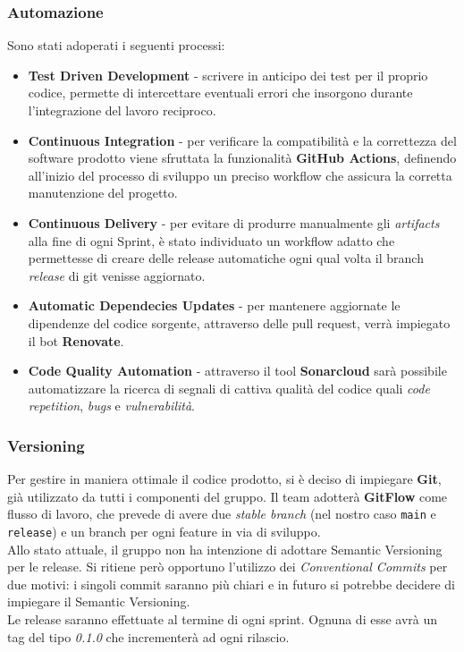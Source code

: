 \subsubsection{Automazione}
Sono stati adoperati i seguenti processi:
\begin{itemize}
    \item \textbf{Test Driven Development} - scrivere in anticipo dei test per il proprio codice,
    permette di intercettare eventuali errori che insorgono durante l'integrazione del lavoro reciproco.
    \item \textbf{Continuous Integration} - per verificare la compatibilità e la correttezza del software prodotto
    viene sfruttata la funzionalità \textbf{GitHub Actions}, definendo all'inizio del processo di sviluppo un
    preciso workflow che assicura la corretta manutenzione del progetto.
    \item \textbf{Continuous Delivery} - per evitare di produrre manualmente gli \textit{artifacts}
    alla fine di ogni Sprint, è stato individuato un workflow adatto che permettesse di creare delle
    release automatiche ogni qual volta il branch \textit{release} di git venisse aggiornato.
    \item \textbf{Automatic Dependecies Updates} - per mantenere aggiornate le dipendenze del codice sorgente, attraverso
    delle pull request, verrà impiegato il bot \textbf{Renovate}.
    \item \textbf{Code Quality Automation} - attraverso il tool \textbf{Sonarcloud} sarà possibile automatizzare la ricerca
    di segnali di cattiva qualità del codice quali \textit{code repetition}, \textit{bugs} e \textit{vulnerabilità}.
\end{itemize}

\subsubsection{Versioning}
Per gestire in maniera ottimale il codice prodotto, si è deciso di impiegare \textbf{Git}, già utilizzato da tutti i componenti del gruppo. Il team adotterà \textbf{GitFlow} come flusso di lavoro, che prevede di avere due \textit{stable branch} (nel nostro caso \texttt{main} e \texttt{release}) e un branch per ogni feature in via di sviluppo. \\
Allo stato attuale, il gruppo non ha intenzione di adottare Semantic Versioning per le release.
Si ritiene però opportuno l'utilizzo dei \textit{Conventional Commits} per due motivi: i singoli commit saranno più chiari
e in futuro si potrebbe decidere di impiegare il Semantic Versioning. \\
Le release saranno effettuate al termine di ogni sprint. Ognuna di esse avrà un tag del tipo \textit{0.1.0} che incrementerà ad ogni rilascio.

